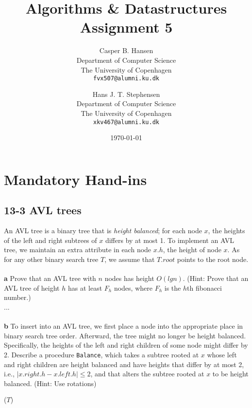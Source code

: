 \documentclass[11pt,english]{article}
\title
{
	\vspace{1in}
	Algorithms \& Datastructures\\
	\huge Assignment 5
}
\author
{
	Casper B. Hansen\\
	\small Department of Computer Science\\
	\small The University of Copenhagen\\
	\texttt{fvx507@alumni.ku.dk}
	\and
	Hans J. T. Stephensen\\
	\small Department of Computer Science\\
	\small The University of Copenhagen\\
	\texttt{xkv467@alumni.ku.dk}
}
\date{\today}
\begin{document}
\clearpage
\maketitle
\thispagestyle{empty}


\newpage
\pagestyle{fancy}

\section*{Mandatory Hand-ins}

\subsection*{13-3 AVL trees}
\large{An AVL tree is a binary tree that is \textit{height balanced}; for each
node $x$, the heights of the left and right subtrees of $x$ differs by at most
1. To implement an AVL tree, we maintain an extra attribute in each node $x.h$,
the height of node $x$. As for any other binary search tree $T$, we assume
that $T.root$ points to the root node.}
\\\\
\noindent \large{\textbf{a} \mdseries Prove that an AVL tree with $n$ nodes
has height $O(lg n)$. (Hint: Prove that an AVL tree of height $h$ has at
least $F_h$ nodes, where $F_h$ is the $h$th fibonacci number.)}
\\
...
\\\\
\noindent \large{\textbf{b} \mdseries To insert into an AVL tree, we first
place a node into the appropriate place in binary search tree order.
Afterward, the tree might no longer be height balanced. Specifically, the
heights of the left and right children of some node might differ by 2.
Describe a procedure \texttt{Balance}, which takes a subtree rooted at $x$
whose left and right children are height balanced and have heights that differ
by at most 2, i.e., $|x.right.h - x.left.h| \leq 2$, and that alters the
subtree rooted at $x$ to be height balanced. (Hint: Use rotations)}
\\
\begin{algorithm}
	\BlankLine
	
	\Balance($T$) \\
	\Begin
	{
		{
			
		}
	}
\end{algorithm}
\end{document}
